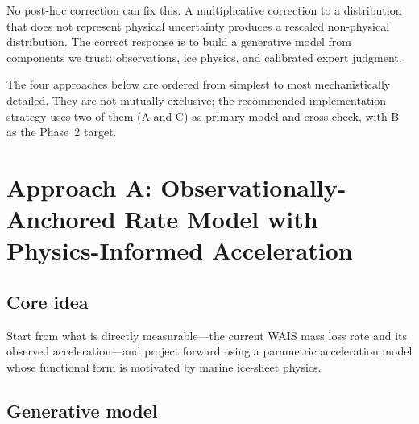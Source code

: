\documentclass[11pt]{article}
\begin{document}
No post-hoc correction can fix this.  A multiplicative correction to a distribution that does not represent physical uncertainty produces a rescaled non-physical distribution.  The correct response is to build a generative model from components we trust: observations, ice physics, and calibrated expert judgment.

The four approaches below are ordered from simplest to most mechanistically detailed.  They are not mutually exclusive; the recommended implementation strategy uses two of them (A and C) as primary model and cross-check, with B as the Phase~2 target.


\section{Approach A: Observationally-Anchored Rate Model with Physics-Informed Acceleration}
\label{sec:approach_a}

\subsection{Core idea}

Start from what is directly measurable---the current WAIS mass loss rate and its observed acceleration---and project forward using a parametric acceleration model whose functional form is motivated by marine ice-sheet physics.

\subsection{Generative model}
\end{document}
